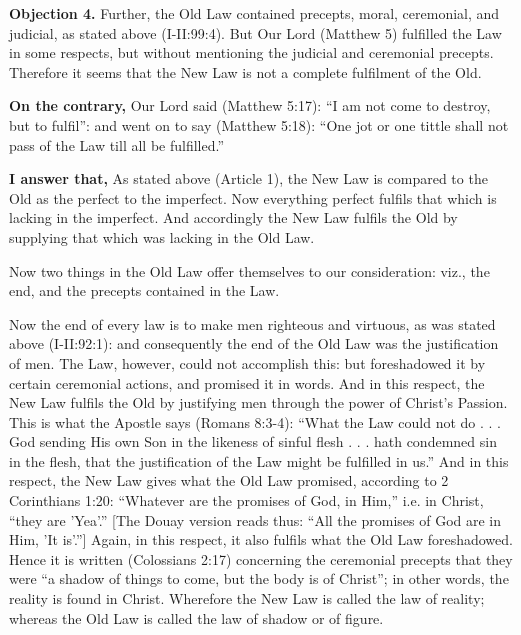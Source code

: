\textbf{Objection 4.} Further, the Old Law contained precepts, moral, ceremonial, and judicial, as stated above (I-II:99:4). But Our Lord (Matthew 5) fulfilled the Law in some respects, but without mentioning the judicial and ceremonial precepts. Therefore it seems that the New Law is not a complete fulfilment of the Old.

\textbf{On the contrary,} Our Lord said (Matthew 5:17): ``I am not come to destroy, but to fulfil'': and went on to say (Matthew 5:18): ``One jot or one tittle shall not pass of the Law till all be fulfilled.''

\textbf{I answer that,} As stated above (Article 1), the New Law is compared to the Old as the perfect to the imperfect. Now everything perfect fulfils that which is lacking in the imperfect. And accordingly the New Law fulfils the Old by supplying that which was lacking in the Old Law.

Now two things in the Old Law offer themselves to our consideration: viz., the end, and the precepts contained in the Law.

Now the end of every law is to make men righteous and virtuous, as was stated above (I-II:92:1): and consequently the end of the Old Law was the justification of men. The Law, however, could not accomplish this: but foreshadowed it by certain ceremonial actions, and promised it in words. And in this respect, the New Law fulfils the Old by justifying men through the power of Christ's Passion. This is what the Apostle says (Romans 8:3-4): ``What the Law could not do . . . God sending His own Son in the likeness of sinful flesh . . . hath condemned sin in the flesh, that the justification of the Law might be fulfilled in us.'' And in this respect, the New Law gives what the Old Law promised, according to 2 Corinthians 1:20: ``Whatever are the promises of God, in Him,'' i.e. in Christ, ``they are 'Yea'.'' [The Douay version reads thus: ``All the promises of God are in Him, 'It is'.''] Again, in this respect, it also fulfils what the Old Law foreshadowed. Hence it is written (Colossians 2:17) concerning the ceremonial precepts that they were ``a shadow of things to come, but the body is of Christ''; in other words, the reality is found in Christ. Wherefore the New Law is called the law of reality; whereas the Old Law is called the law of shadow or of figure.

